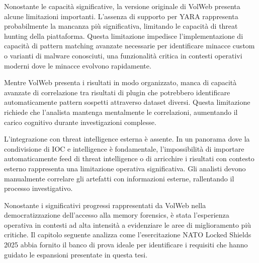 Nonostante le capacità significative, la versione originale di VolWeb presenta alcune limitazioni importanti. L'assenza di supporto per YARA rappresenta probabilmente la mancanza più significativa, limitando le capacità di threat hunting della piattaforma. Questa limitazione impedisce l'implementazione di capacità di pattern matching avanzate necessarie per identificare minacce custom o varianti di malware conosciuti, una funzionalità critica in contesti operativi moderni dove le minacce evolvono rapidamente.

Mentre VolWeb presenta i risultati in modo organizzato, manca di capacità avanzate di correlazione tra risultati di plugin che potrebbero identificare automaticamente pattern sospetti attraverso dataset diversi. Questa limitazione richiede che l'analista mantenga mentalmente le correlazioni, aumentando il carico cognitivo durante investigazioni complesse.

L'integrazione con threat intelligence esterna è assente. In un panorama dove la condivisione di IOC e intelligence è fondamentale, l'impossibilità di importare automaticamente feed di threat intelligence o di arricchire i risultati con contesto esterno rappresenta una limitazione operativa significativa. Gli analisti devono manualmente correlare gli artefatti con informazioni esterne, rallentando il processo investigativo.

Nonostante i significativi progressi rappresentati da VolWeb nella democratizzazione dell'accesso alla memory forensics, è stata l'esperienza operativa in contesti ad alta intensità a evidenziare le aree di miglioramento più critiche. Il capitolo seguente analizza come l'esercitazione NATO Locked Shields 2025 abbia fornito il banco di prova ideale per identificare i requisiti che hanno guidato le espansioni presentate in questa tesi.